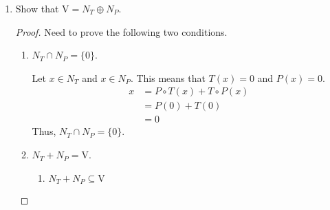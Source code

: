 \documentclass[11pt]{scrartcl}
\begin{document}
\begin{enumerate}[label=\alph*.]
{\begin{proof}
\begin{enumerate}[label=\roman*.]
{\begin{enumerate}[label=\arabic*.]
{				                  $N_T  \subseteq T(N_P)$\par
				                  Let $x \in N_T$. By definition, $T(x) = 0$.
				                  \begin{align*}
					                  P \circ T(x) + T \circ P(x) & = x \\
					                  P(0) + T \circ P(x)         & = x \\
					                  T \circ P(x)                & = x
				                  \end{align*}
				                  Notice that $P(x) \in N_P$, so $x \in T(N_P)$. Thus, $N_T  \subseteq T(N_P)$.
				                  }
				            \item{
				                  $T(N_P) \subseteq N_T$\par
				                  Let $T(x) \in T(N_P)$ where $x \in N_P$.\\
				                  $T \circ T(x) = 0$ so $T(x) \in N_T$. Thus, $T(N_P) \subseteq N_T$.
				                  }
			            \end{enumerate}
			            Therfore, $N_P = P(N_T)$.
			            }
		      \end{enumerate}
	      \end{proof}
	      }
	\item{
	      Show that $\mathrm{V} = N_T \oplus N_P$.
	      \begin{proof}
		      Need to prove the following two conditions.
		      \begin{enumerate}[label=\roman*.]
			      \item{
			            $N_T \cap N_P = \{0\}$.	\par
			            Let $x \in N_T$ and $x \in N_P$. This means that $T(x) = 0$ and $P(x) = 0$.
			            \begin{align*}
				            x & = P \circ T(x) + T \circ P(x) \\
				              & = P(0) + T(0)                 \\
				              & = 0
			            \end{align*}
			            Thus, $N_T \cap N_P = \{0\}$.\\
			            }
			      \item{
			            $N_T + N_P = \mathrm{V}$.
			            \begin{enumerate}[label=\arabic*.]
				            \item{
				                  $N_T + N_P \subseteq \mathrm{V}$\\
}
\end{enumerate}}
\end{enumerate}
\end{proof}}
\end{enumerate}
\end{document}
